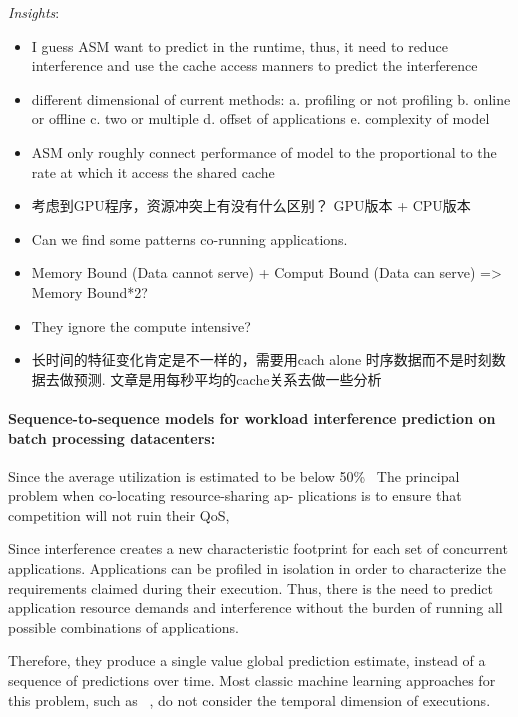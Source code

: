 \documentclass[8pt,UTF8]{article}
\begin{document}
                
                \emph{Insights}: 
                \begin{itemize}
                    \item I guess ASM want to predict in the runtime, thus, it need to reduce interference and use the cache access manners to predict the interference 
                    \item different dimensional of current methods: a. profiling or not profiling b. online or offline c. two or multiple d. offset of applications e. complexity of model 
                    \item ASM only roughly connect performance of model to the proportional to the rate at which it access the shared cache 
                    \item 考虑到GPU程序，资源冲突上有没有什么区别？ GPU版本 + CPU版本 
                    \item Can we find some patterns co-running applications. 
                    \item Memory Bound (Data cannot serve) + Comput Bound (Data can serve) => Memory Bound*2? 
                    \item They ignore the compute intensive?
                    \item 长时间的特征变化肯定是不一样的，需要用cach alone 时序数据而不是时刻数据去做预测. 文章是用每秒平均的cache关系去做一些分析
                \end{itemize}
            \paragraph{Sequence-to-sequence models for workload interference prediction on batch processing datacenters:}
        
                Since the average utilization is estimated to be below 50\%~\cite{barroso2007case, reiss2012heterogeneity} The principal problem when co-locating resource-sharing ap- plications is to ensure that competition will not ruin their QoS,
                
                Since interference creates a new characteristic footprint for each set of concurrent applications. Applications can be profiled in isolation in order to characterize the requirements claimed during their execution. Thus, there is the need to predict application resource demands and interference without the burden of running all possible combinations of applications.
                
                Therefore, they produce a single value global prediction estimate, instead of a sequence of predictions over time. Most classic machine learning approaches for this problem, such as ~\cite{mishra2017esp, delimitrou2013paragon}, do not consider the temporal dimension of executions.
                
\end{document}
